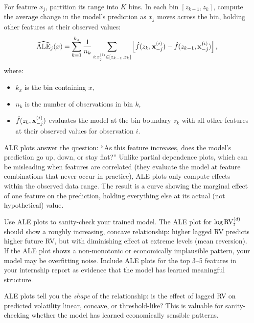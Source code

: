 \begin{definition}
For feature $x_j$, partition its range into $K$ bins.
In each bin $[z_{k-1}, z_k]$, compute the average change in the model's prediction as $x_j$ moves across the bin, holding other features at their observed values:
\begin{equation}\label{eq:ale}
\widehat{\text{ALE}}_j(x) = \sum_{k=1}^{k_x} \frac{1}{n_k} \sum_{i: x_j^{(i)} \in [z_{k-1}, z_k]} \left[ \hat{f}(z_k, \mathbf{x}_{-j}^{(i)}) - \hat{f}(z_{k-1}, \mathbf{x}_{-j}^{(i)}) \right],
\end{equation}
where:
\begin{itemize}[nosep]
  \item $k_x$ is the bin containing $x$,
  \item $n_k$ is the number of observations in bin $k$,
  \item $\hat{f}(z_k, \mathbf{x}_{-j}^{(i)})$ evaluates the model at the bin boundary $z_k$ with all other features at their observed values for observation $i$.
\end{itemize}
\end{definition}

\begin{intuition}
ALE plots answer the question: ``As this feature increases, does the model's prediction go up, down, or stay flat?'' Unlike partial dependence plots, which can be misleading when features are correlated (they evaluate the model at feature combinations that never occur in practice), ALE plots only compute effects within the observed data range. The result is a curve showing the marginal effect of one feature on the prediction, holding everything else at its actual (not hypothetical) value.
\end{intuition}

\begin{projectconnection}
Use ALE plots to sanity-check your trained model. The ALE plot for $\log \operatorname{RV}_t^{(d)}$ should show a roughly increasing, concave relationship: higher lagged RV predicts higher future RV, but with diminishing effect at extreme levels (mean reversion). If the ALE plot shows a non-monotonic or economically implausible pattern, your model may be overfitting noise. Include ALE plots for the top 3--5 features in your internship report as evidence that the model has learned meaningful structure.
\end{projectconnection}

ALE plots tell you the \emph{shape} of the relationship: is the effect of lagged RV on predicted volatility linear, concave, or threshold-like?
This is valuable for sanity-checking whether the model has learned economically sensible patterns.

